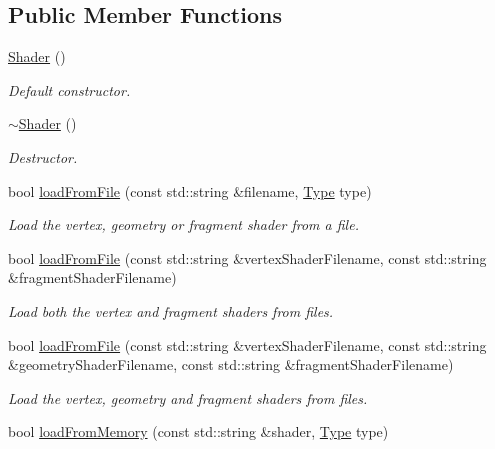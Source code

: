 \subsection*{Public Member Functions}
\begin{DoxyCompactItemize}
\item 
\mbox{\hyperlink{classsf_1_1_shader_a1d7f28f26b4122959fcafec871c2c3c5}{Shader}} ()
\begin{DoxyCompactList}\small\item\em Default constructor. \end{DoxyCompactList}\item 
\mbox{\hyperlink{classsf_1_1_shader_a4bac6cc8b046ecd8fb967c145a2380e6}{$\sim$\+Shader}} ()
\begin{DoxyCompactList}\small\item\em Destructor. \end{DoxyCompactList}\item 
bool \mbox{\hyperlink{classsf_1_1_shader_a053a5632848ebaca2fcd8ba29abe9e6e}{load\+From\+File}} (const std\+::string \&filename, \mbox{\hyperlink{classsf_1_1_shader_afaa1aa65e5de37b74d047da9def9f9b3}{Type}} type)
\begin{DoxyCompactList}\small\item\em Load the vertex, geometry or fragment shader from a file. \end{DoxyCompactList}\item 
bool \mbox{\hyperlink{classsf_1_1_shader_ac9d7289966fcef562eeb92271c03e3dc}{load\+From\+File}} (const std\+::string \&vertex\+Shader\+Filename, const std\+::string \&fragment\+Shader\+Filename)
\begin{DoxyCompactList}\small\item\em Load both the vertex and fragment shaders from files. \end{DoxyCompactList}\item 
bool \mbox{\hyperlink{classsf_1_1_shader_a295d8468811ca15bf9c5401a7a7d4f54}{load\+From\+File}} (const std\+::string \&vertex\+Shader\+Filename, const std\+::string \&geometry\+Shader\+Filename, const std\+::string \&fragment\+Shader\+Filename)
\begin{DoxyCompactList}\small\item\em Load the vertex, geometry and fragment shaders from files. \end{DoxyCompactList}\item 
bool \mbox{\hyperlink{classsf_1_1_shader_ac92d46bf71dff2d791117e4e472148aa}{load\+From\+Memory}} (const std\+::string \&shader, \mbox{\hyperlink{classsf_1_1_shader_afaa1aa65e5de37b74d047da9def9f9b3}{Type}} type)

\end{DoxyCompactItemize}
